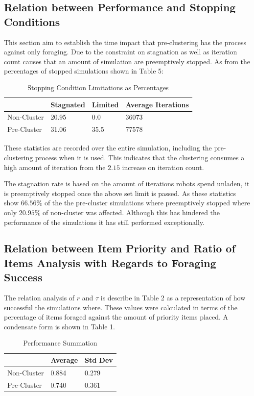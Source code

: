 \documentclass[12pt]{article}
\begin{document}
\subsection{Relation between Performance and Stopping Conditions}

\par{This section aim to establish the time impact that pre-clustering has the process against only foraging. Due to the constraint on stagnation as well as iteration count causes that an amount of simulation are preemptively stopped. As from the percentages of stopped simulations shown in Table 5:}
\\
\begin{table}[h]
\centering
\begin{tabular}{|l|l|l|l|}
\hline
            & Stagnated & Limited & Average Iterations \\ \hline
Non-Cluster & 20.95     & 0.0     & 36073              \\ \hline
Pre-Cluster & 31.06     & 35.5    & 77578              \\ \hline
\end{tabular}
\caption{Stopping Condition Limitations as Percentages}
\label{my-label}
\end{table}

\par{These statistics are recorded over the entire simulation, including the pre-clustering process when it is used. This indicates that the clustering consumes a high amount of iteration from the $2.15$ increase on iteration count.}

\par{The stagnation rate is based on the amount of iterations robots spend unladen, it is preemptively stopped once the above set limit is passed. As these statistics show $66.56\%$ of the the pre-cluster simulations where preemptively stopped where only $20.95\%$ of non-cluster was affected. Although this has hindered the performance of the simulations it has still performed exceptionally.}

\subsection{Relation between Item Priority and Ratio of Items Analysis with Regards to Foraging Success}
\par{The relation analysis of $r$ and $\tau$ is describe in Table 2 as a representation of how successful the simulations where. These values were calculated in terms of the percentage of items foraged against the amount of priority items placed. A condensate form is shown in Table 1.}
\\
\begin{table}[h]
\centering
\begin{tabular}{|l|l|l|}
\hline
            & Average & Std Dev \\ \hline
Non-Cluster & 0.884   & 0.279   \\ \hline
Pre-Cluster & 0.740   & 0.361   \\ \hline
\end{tabular}
\caption{Performance Summation}
\label{my-label}
\end{table}
\end{document}
